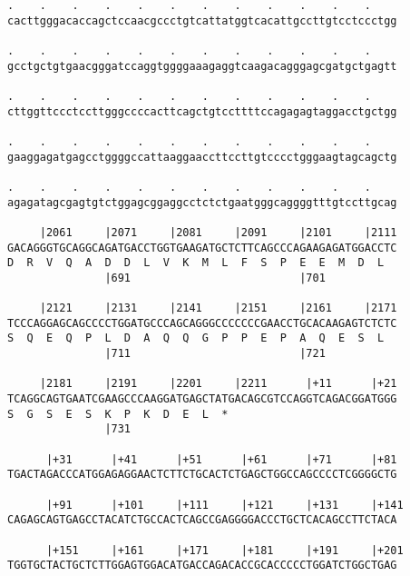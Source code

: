 \documentclass{article}
\begin{document}
\begin{Verbatim}
.    .    .    .    .    .    .    .    .    .    .    .    
cacttgggacaccagctccaacgccctgtcattatggtcacattgccttgtcctccctgg
                                                            
.    .    .    .    .    .    .    .    .    .    .    .    
gcctgctgtgaacgggatccaggtggggaaagaggtcaagacagggagcgatgctgagtt
                                                            
.    .    .    .    .    .    .    .    .    .    .    .    
cttggttccctccttgggccccacttcagctgtccttttccagagagtaggacctgctgg
                                                            
.    .    .    .    .    .    .    .    .    .    .    .    
gaaggagatgagcctggggccattaaggaaccttccttgtcccctgggaagtagcagctg
                                                            
.    .    .    .    .    .    .    .    .    .    .    .    
agagatagcgagtgtctggagcggaggcctctctgaatgggcaggggtttgtccttgcag
                                                            
     |2061     |2071     |2081     |2091     |2101     |2111
GACAGGGTGCAGGCAGATGACCTGGTGAAGATGCTCTTCAGCCCAGAAGAGATGGACCTC
D  R  V  Q  A  D  D  L  V  K  M  L  F  S  P  E  E  M  D  L  
               |691                          |701           
  
     |2121     |2131     |2141     |2151     |2161     |2171
TCCCAGGAGCAGCCCCTGGATGCCCAGCAGGGCCCCCCCGAACCTGCACAAGAGTCTCTC
S  Q  E  Q  P  L  D  A  Q  Q  G  P  P  E  P  A  Q  E  S  L  
               |711                          |721           
  
     |2181     |2191     |2201     |2211      |+11      |+21
TCAGGCAGTGAATCGAAGCCCAAGGATGAGCTATGACAGCGTCCAGGTCAGACGGATGGG
S  G  S  E  S  K  P  K  D  E  L  *   
               |731                                         
  
      |+31      |+41      |+51      |+61      |+71      |+81
TGACTAGACCCATGGAGAGGAACTCTTCTGCACTCTGAGCTGGCCAGCCCCTCGGGGCTG
                                                            
      |+91      |+101     |+111     |+121     |+131     |+141
CAGAGCAGTGAGCCTACATCTGCCACTCAGCCGAGGGGACCCTGCTCACAGCCTTCTACA
                                                            
      |+151     |+161     |+171     |+181     |+191     |+201
TGGTGCTACTGCTCTTGGAGTGGACATGACCAGACACCGCACCCCCTGGATCTGGCTGAG
                                                            

\end{Verbatim}
\end{document}
